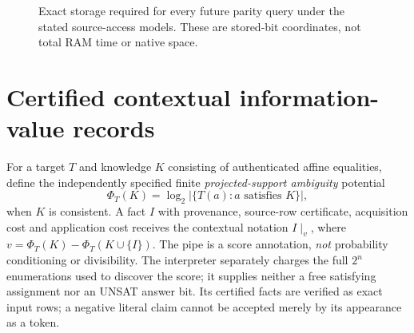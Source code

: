 \documentclass[10pt]{article}
\begin{document}
\begin{figure}[ht]\centering
{}
\caption{Exact storage required for every future parity query under the stated source-access models. These are stored-bit coordinates, not total RAM time or native space.}
\end{figure}

\section{Certified contextual information-value records}
For a target $T$ and knowledge $K$ consisting of authenticated affine equalities, define the independently specified finite \emph{projected-support ambiguity} potential
\[
\Phi_T(K)=\log_2\big|\{T(a):a\text{ satisfies }K\}\big|,
\]
when $K$ is consistent. A fact $I$ with provenance, source-row certificate, acquisition cost and application cost receives the contextual notation $I\mid_{v}$, where $v=\Phi_T(K)-\Phi_T(K\cup\{I\})$. The pipe is a score annotation, \emph{not} probability conditioning or divisibility. The interpreter separately charges the full $2^n$ enumerations used to discover the score; it supplies neither a free satisfying assignment nor an UNSAT answer bit. Its certified facts are verified as exact input rows; a negative literal claim cannot be accepted merely by its appearance as a token.
\end{document}
